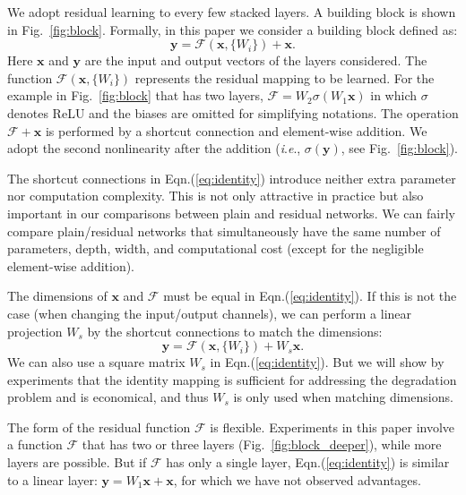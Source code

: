 \documentclass{article}
\newcommand{\ie}{\textit{i}.\textit{e}.}
\newcommand{\ve}[1]{\mathbf{#1}} %
\begin{document}
We adopt residual learning to every few stacked layers.
A building block is shown in Fig.~\ref{fig:block}. Formally, in this paper we consider a building block defined as:
\begin{equation}\label{eq:identity}
\ve{y}= \mathcal{F}(\ve{x}, \{W_{i}\}) + \ve{x}.
\end{equation}
Here $\ve{x}$ and $\ve{y}$ are the input and output vectors of the layers considered. The function $\mathcal{F}(\ve{x}, \{W_{i}\})$ represents the residual mapping to be learned. For the example in Fig.~\ref{fig:block} that has two layers, $\mathcal{F}=W_{2}\sigma(W_{1}\ve{x})$ in which $\sigma$ denotes ReLU \cite{Nair2010} and the biases are omitted for simplifying notations. The operation $\mathcal{F}+\ve{x}$ is performed by a shortcut connection and element-wise addition. We adopt the second nonlinearity after the addition (\ie, $\sigma(\ve{y})$, see Fig.~\ref{fig:block}).

The shortcut connections in Eqn.(\ref{eq:identity}) introduce neither extra parameter nor computation complexity. This is not only attractive in practice but also important in our comparisons between plain and residual networks. We can fairly compare plain/residual networks that simultaneously have the same number of parameters, depth, width, and computational cost (except for the negligible element-wise addition).

The dimensions of $\ve{x}$ and $\mathcal{F}$ must be equal in Eqn.(\ref{eq:identity}). If this is not the case (when changing the input/output channels), we can perform a linear projection $W_{s}$ by the shortcut connections to match the dimensions:
\begin{equation}\label{eq:transform}
\ve{y}= \mathcal{F}(\ve{x}, \{W_{i}\}) + W_{s}\ve{x}.
\end{equation}
We can also use a square matrix $W_{s}$ in Eqn.(\ref{eq:identity}). But we will show by experiments that the identity mapping is sufficient for addressing the degradation problem and is economical, and thus $W_{s}$ is only used when matching dimensions.

The form of the residual function $\mathcal{F}$ is flexible. Experiments in this paper involve a function $\mathcal{F}$ that has two or three layers (Fig.~\ref{fig:block_deeper}), while more layers are possible. But if $\mathcal{F}$ has only a single layer, Eqn.(\ref{eq:identity}) is similar to a linear layer: $\ve{y}=W_1\ve{x}+\ve{x}$, for which we have not observed advantages.
\end{document}
